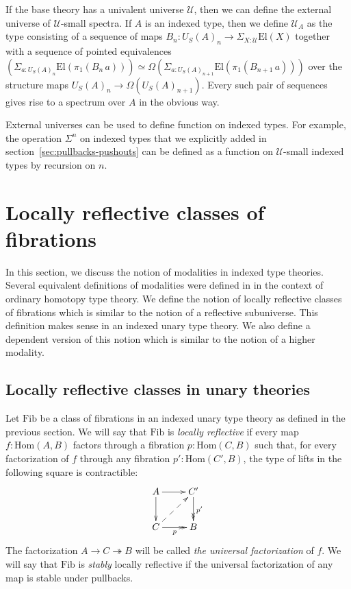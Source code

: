 \documentclass[reqno]{mscs}
\newcommand{\fs}[1]{\mathrm{#1}}
\newcommand{\Hom}{\fs{Hom}}
\newcommand{\Fib}{\fs{Fib}}
\newcommand{\El}{\fs{El}}
\numberwithin{figure}{section}
\begin{document}
\begin{example}
If the base theory has a univalent universe $\mathcal{U}$, then we can define the external universe of $\mathcal{U}$-small spectra.
If $A$ is an indexed type, then we define $\mathcal{U}_A$ as the type consisting of a sequence of maps $B_n : U_S(A)_n \to \Sigma_{X : \mathcal{U}} \El(X)$
together with a sequence of pointed equivalences $(\Sigma_{a : U_S(A)_n} \El(\pi_1(B_n\,a))) \simeq \Omega(\Sigma_{a : U_S(A)_{n+1}} \El(\pi_1(B_{n+1}\,a)))$ over the structure maps $U_S(A)_n \to \Omega(U_S(A)_{n+1})$.
Every such pair of sequences gives rise to a spectrum over $A$ in the obvious way.
\end{example}

External universes can be used to define function on indexed types.
For example, the operation $\Sigma^n$ on indexed types that we explicitly added in section~\ref{sec:pullbacks-pushouts} can be defined as a function on $\mathcal{U}$-small indexed types by recursion on $n$.

\section{Locally reflective classes of fibrations}
\label{sec:refl-fib}

In this section, we discuss the notion of modalities in indexed type theories.
Several equivalent definitions of modalities were defined in \cite{modality-hott} in the context of ordinary homotopy type theory.
We define the notion of locally reflective classes of fibrations which is similar to the notion of a reflective subuniverse.
This definition makes sense in an indexed unary type theory.
We also define a dependent version of this notion which is similar to the notion of a higher modality.

\subsection{Locally reflective classes in unary theories}

Let $\Fib$ be a class of fibrations in an indexed unary type theory as defined in the previous section.
We will say that $\Fib$ is \emph{locally reflective} if every map $f : \Hom(A,B)$ factors through a fibration $p : \Hom(C,B)$
such that, for every factorization of $f$ through any fibration $p' : \Hom(C',B)$, the type of lifts in the following square is contractible:
\[ \xymatrix{ A \ar[r] \ar[d]                   & C' \ar@{->>}[d]^{p'} \\
              C \ar@{->>}[r]_p \ar@{-->}[ur]    & B
            } \]
The factorization $A \to C \twoheadrightarrow B$ will be called \emph{the universal factorization} of $f$.
We will say that $\Fib$ is \emph{stably} locally reflective if the universal factorization of any map is stable under pullbacks.
\end{document}
